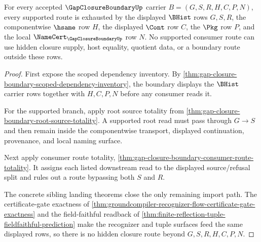 \begin{theorem}
\label{thm:gap-closure-boundary-supported-route-exhaustion}
For every accepted $\GapClosureBoundaryUp$ carrier $B=(G,S,R,H,C,P,N)$, every supported route is exhausted by the displayed $\BHist$ rows $G,S,R$, the componentwise $\hsame$ row $H$, the displayed $\Cont$ row $C$, the $\Pkg$ row $P$, and the local $\NameCert_{\GapClosureBoundaryUp}$ row $N$. No supported consumer route can use hidden closure supply, host equality, quotient data, or a boundary route outside these rows.
\end{theorem}
\begin{proof}
First expose the scoped dependency inventory. By \autoref{thm:gap-closure-boundary-scoped-dependency-inventory}, the boundary displays the $\BHist$ carrier rows together with $H,C,P,N$ before any consumer reads it.

For the supported branch, apply root source totality from \autoref{thm:gap-closure-boundary-root-source-totality}. A supported root read must pass through $G \longrightarrow S$ and then remain inside the componentwise transport, displayed continuation, provenance, and local naming surface.

Next apply consumer route totality, \autoref{thm:gap-closure-boundary-consumer-route-totality}. It assigns each listed downstream read to the displayed source/refusal split and rules out a route bypassing both $S$ and $R$.

The concrete sibling landing theorems close the only remaining import path. The certificate-gate exactness of \autoref{thm:groundcompiler-recognizer-flow-certificate-gate-exactness} and the field-faithful readback of \autoref{thm:finite-reflection-tuple-fieldfaithful-prediction} make the recognizer and tuple surfaces feed the same displayed rows, so there is no hidden closure route beyond $G,S,R,H,C,P,N$.
\end{proof}

